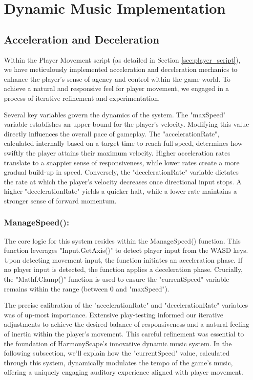 \documentclass{l4proj}
\begin{document}
\section{Dynamic Music Implementation}

\subsection{Acceleration and Deceleration}

Within the Player Movement script (as detailed in Section \ref{sec:player_script}), we have meticulously implemented acceleration and deceleration mechanics to enhance the player's sense of agency and control within the game world. To achieve a natural and responsive feel for player movement, we engaged in a process of iterative refinement and experimentation.
    
Several key variables govern the dynamics of the system. The "maxSpeed" variable establishes an upper bound for the player's velocity. Modifying this value directly influences the overall pace of gameplay. The "accelerationRate", calculated internally based on a target time to reach full speed, determines how swiftly the player attains their maximum velocity. Higher acceleration rates translate to a snappier sense of responsiveness, while lower rates create a more gradual build-up in speed. Conversely, the "decelerationRate" variable dictates the rate at which the player's velocity decreases once directional input stops. A higher "decelerationRate" yields a quicker halt, while a lower rate maintains a stronger sense of forward momentum.
    
\subsubsection{ManageSpeed():} The core logic for this system resides within the ManageSpeed() function. This function leverages "Input.GetAxis()" to detect player input from the WASD keys. Upon detecting movement input, the function initiates an acceleration phase.  If no player input is detected, the function applies a deceleration phase. Crucially, the "Mathf.Clamp()" function is used to ensure the "currentSpeed" variable remains within the range (between 0 and "maxSpeed").
    
The precise calibration of the "accelerationRate" and "decelerationRate" variables was of up-most importance. Extensive play-testing informed our iterative adjustments to achieve the desired balance of responsiveness and a natural feeling of inertia within the player's movement. This careful refinement was essential to the foundation of HarmonyScape's innovative dynamic music system. In the following subsection, we'll explain how the "currentSpeed" value, calculated through this system, dynamically modulates the tempo of the game's music, offering a uniquely engaging auditory experience aligned with player movement.
\end{document}
